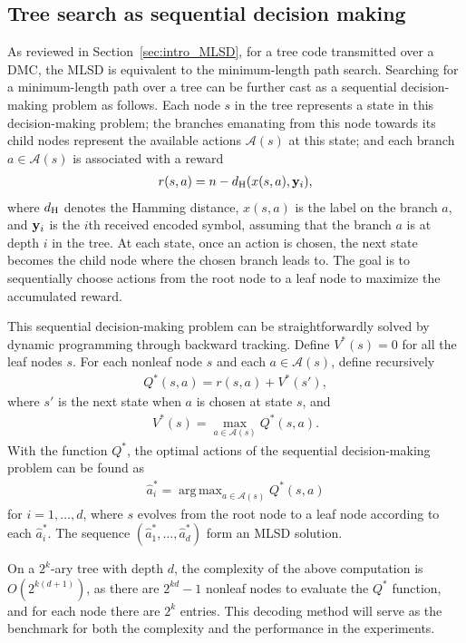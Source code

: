 \documentclass[conference,letterpaper]{IEEEtran}
\DeclareMathOperator*{\argmax}{arg\,max}
\begin{document}
\subsection{Tree search as sequential decision making}
As reviewed in Section~\ref{sec:intro_MLSD}, for a tree code transmitted over a DMC, the MLSD is equivalent to the minimum-length path search.
Searching for a minimum-length path over a tree can be further cast as a sequential decision-making problem as follows.
Each node $s$ in the tree represents a state in this decision-making problem; the branches emanating from this node towards its child nodes represent the available actions $\mathcal A(s)$ at this state; and each branch $a\in\mathcal A(s)$ is associated with a reward 
\begin{align}\label{eq:rwd}
r(s,a) = n - d_{\rm H}(x(s,a),{\bf y}_i) ,
\end{align}
where $d_{\rm H}$ denotes the Hamming distance, $x(s,a)$ is the label on the branch $a$, and ${\bf y}_i$ is the $i$th received encoded symbol, assuming that the branch $a$ is at depth $i$ in the tree.
At each state, once an action is chosen, the next state becomes the child node where the chosen branch leads to.
The goal is to sequentially choose actions from the root node to a leaf node to maximize the accumulated reward.

This sequential decision-making problem can be straightforwardly solved by dynamic programming through backward tracking.
Define $V^*(s) = 0$ for all the leaf nodes $s$.
For each nonleaf node $s$ and each $a\in\mathcal A(s)$, define recursively
\begin{align}\label{eq:Q*_def}
Q^*(s,a) = r(s,a) + V^*(s') ,
\end{align}
where $s'$ is the next state when $a$ is chosen at state $s$, and 
\begin{align}
	V^*(s) = \max_{a\in\mathcal A(s)} Q^*(s,a) .
\end{align}
With the function $Q^*$, the optimal actions of the sequential decision-making problem can be found as
\begin{align}
\hat a^*_{i} = \argmax_{a\in\mathcal A(s)} Q^*(s,a)
\end{align}
for $i=1,\ldots,d$, where $s$ evolves from the root node to a leaf node according to each $\hat a^*_i$.
The sequence $(\hat a^*_1, \ldots, \hat a^*_d)$ form an MLSD solution.

On a $2^{k}$-ary tree with depth $d$, the complexity of the above computation is $O(2^{k(d+1)})$, as there are $2^{kd}-1$ nonleaf nodes to evaluate the $Q^*$ function, and for each node there are $2^k$ entries.
This decoding method will serve as the benchmark for both the complexity and the performance in the experiments.
\end{document}

